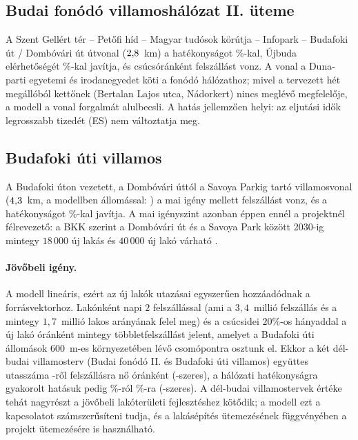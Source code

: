 \documentclass[12pt,a4paper]{article}
\theoremstyle{definition}
\theoremstyle{remark}
\begin{document}
\subsection{Budai fonódó villamoshálózat II. üteme}

A Szent Gellért tér -- Petőfi híd -- Magyar tudósok körútja -- Infopark --
Budafoki út / Dombóvári út útvonal ($2{,}8$~km) a hatékonyságot
\PLBFGAIN\%-kal, Újbuda elérhetőségét \PLBFDXI\%-kal javítja, és
csúcsóránként \PLBFBOARD{} felszállást vonz. A vonal a Duna-parti egyetemi
és irodanegyedet köti a fonódó hálózathoz; mivel a tervezett hét megállóból
kettőnek (Bertalan Lajos utca, Nádorkert) nincs meglévő megfelelője, a modell
a vonal forgalmát alulbecsli. A hatás jellemzően helyi: az eljutási idők
legrosszabb tizedét (ES) nem változtatja meg.

\subsection{Budafoki úti villamos}

A Budafoki úton vezetett, a Dombóvári úttól a Savoya Parkig tartó
villamosvonal ($4{,}3$~km, a modellben \PLBUNST{} állomással: \PLBUSTATIONS)
a mai igény mellett \PLBUBOARD{} felszállást vonz, és a hatékonyságot
\PLBUGAINTHREE\%-kal javítja. A mai igényszint azonban éppen ennél a
projektnél félrevezető: a BKK szerint a Dombóvári út és a Savoya Park között
2030-ig mintegy $18\,000$ új lakás és $40\,000$ új lakó várható
\citep{bkk2026budafoki}.

\paragraph{Jövőbeli igény.}
A modell lineáris, ezért az új lakók utazásai egyszerűen hozzáadódnak a
forrásvektorhoz. Lakónként napi $2$ felszállással (ami a $3{,}4$~millió
felszállás és a mintegy $1{,}7$~millió lakos arányának felel meg) és a
csúcsidei $20\%$-os hányaddal a \DEMRES{} új lakó óránként mintegy
\DEMEXTRA{} többletfelszállást jelent, amelyet a Budafoki úti állomások
$600$~m-es környezetében lévő \DEMCATCH{} csomópontra osztunk el. Ekkor a két
dél-budai villamosterv (Budai fonódó II. és Budafoki úti villamos) együttes
utasszáma \DEMBTODAY-ről \DEMBFUT{} felszállásra nő óránként
(\DEMBRATIO-szeres), a hálózati hatékonyságra gyakorolt hatásuk pedig
\DEMGTODAY\%-ról \DEMGFUT\%-ra (\DEMGRATIO-szeres). A dél-budai villamostervek
értéke tehát nagyrészt a jövőbeli lakóterületi fejlesztéshez kötődik; a
modell ezt a kapcsolatot számszerűsíteni tudja, és a lakásépítés ütemezésének
függvényében a projekt ütemezésére is használható.
\end{document}
